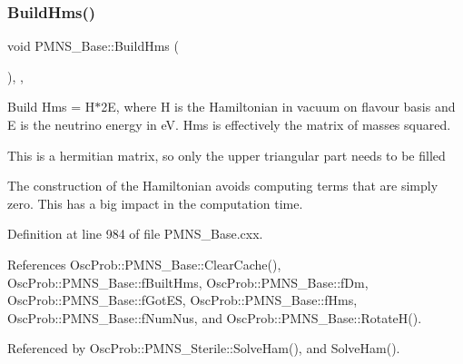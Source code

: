 \mbox{\label{classOscProb_1_1PMNS__Base_ad0faf5eae755afb1baa1fcd5ffebad41}} 
\subsubsection{\texorpdfstring{Build\+Hms()}{BuildHms()}}
{\footnotesize\ttfamily void P\+M\+N\+S\+\_\+\+Base\+::\+Build\+Hms (\begin{DoxyParamCaption}{ }\end{DoxyParamCaption})\hspace{0.3cm}{\ttfamily [protected]}, {\ttfamily [virtual]}, {\ttfamily [inherited]}}

Build Hms = H$\ast$2E, where H is the Hamiltonian in vacuum on flavour basis and E is the neutrino energy in eV. Hms is effectively the matrix of masses squared.

This is a hermitian matrix, so only the upper triangular part needs to be filled

The construction of the Hamiltonian avoids computing terms that are simply zero. This has a big impact in the computation time. 

Definition at line 984 of file P\+M\+N\+S\+\_\+\+Base.\+cxx.



References Osc\+Prob\+::\+P\+M\+N\+S\+\_\+\+Base\+::\+Clear\+Cache(), Osc\+Prob\+::\+P\+M\+N\+S\+\_\+\+Base\+::f\+Built\+Hms, Osc\+Prob\+::\+P\+M\+N\+S\+\_\+\+Base\+::f\+Dm, Osc\+Prob\+::\+P\+M\+N\+S\+\_\+\+Base\+::f\+Got\+ES, Osc\+Prob\+::\+P\+M\+N\+S\+\_\+\+Base\+::f\+Hms, Osc\+Prob\+::\+P\+M\+N\+S\+\_\+\+Base\+::f\+Num\+Nus, and Osc\+Prob\+::\+P\+M\+N\+S\+\_\+\+Base\+::\+Rotate\+H().



Referenced by Osc\+Prob\+::\+P\+M\+N\+S\+\_\+\+Sterile\+::\+Solve\+Ham(), and Solve\+Ham().


